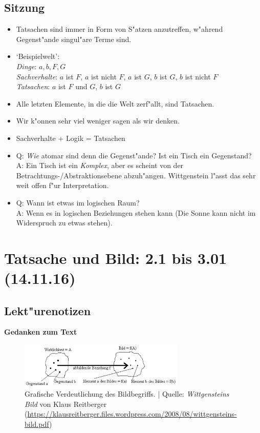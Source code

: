 \documentclass[]{scrartcl}
\begin{document}
\subsection{Sitzung}

\begin{itemize}
  \item Tatsachen sind immer in Form von S"atzen anzutreffen, w"ahrend Gegenst"ande singul"are Terme sind. 
  \item `Beispielwelt':\\\emph{Dinge}: $a, b, F, G$\\\emph{Sachverhalte}: $a$ ist $F$, $a$ ist nicht $F$,  $a$ ist $G$, $b$ ist $G$, $b$ ist nicht $F$\\\emph{Tatsachen}:  $a$ ist $F$ und $G$, $b$ ist $G$
  \item Alle letzten Elemente, in die die Welt zerf"allt, sind Tatsachen.
  \item Wir k"onnen sehr viel weniger sagen als wir denken.
  \item Sachverhalte + Logik = Tatsachen
  \item Q: \emph{Wie} atomar sind denn die Gegenst"ande? Ist ein Tisch ein Gegenstand?\\A: Ein Tisch ist ein \emph{Komplex}, aber es scheint von der Betrachtungs-/Abstraktionsebene abzuh"angen. Wittgenstein l"asst das sehr weit offen f"ur Interpretation.
  \item Q: Wann ist etwas im logischen Raum?\\A: Wenn es in logischen Beziehungen stehen kann (Die Sonne kann nicht im Widerspruch zu etwas stehen).
\end{itemize}

\section{Tatsache und Bild: 2.1 bis 3.01\\(14.11.16)}


\subsection{Lekt"urenotizen}
\textbf{Gedanken zum Text}

\begin{figure}[h]
	\centering
	\includegraphics[width=0.7\textwidth]{images/tractatus/bild}
	\caption{Grafische Verdeutlichung des Bildbegriffs. | Quelle: \emph{Wittgensteins Bild}
von Klaus Reitberger (\url{https://klausreitberger.files.wordpress.com/2008/08/wittgensteins-bild.pdf})}
	\label{fig:bild}
\end{figure}
\end{document}
